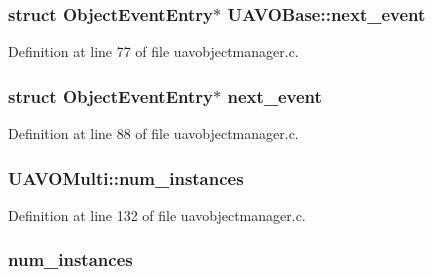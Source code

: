 \hypertarget{group___u_a_v_gaa0d6ea1fcd5ae56953e8dd7f244dd988}{
\subsubsection[{next\-\_\-event}]{\setlength{\rightskip}{0pt plus 5cm}struct {\bf Object\-Event\-Entry}$\ast$ U\-A\-V\-O\-Base\-::next\-\_\-event}}\label{group___u_a_v_gaa0d6ea1fcd5ae56953e8dd7f244dd988}


Definition at line 77 of file uavobjectmanager.\-c.

\hypertarget{group___u_a_v_ga198dfe31641d68ac23d11a5f98b07ac1}{
\subsubsection[{next\-\_\-event}]{\setlength{\rightskip}{0pt plus 5cm}struct {\bf Object\-Event\-Entry}$\ast$ next\-\_\-event}}\label{group___u_a_v_ga198dfe31641d68ac23d11a5f98b07ac1}


Definition at line 88 of file uavobjectmanager.\-c.

\hypertarget{group___u_a_v_ga9502c6a24b6d21d6ec4e48fbe166f1c4}{
\subsubsection[{num\-\_\-instances}]{ U\-A\-V\-O\-Multi\-::num\-\_\-instances}}\label{group___u_a_v_ga9502c6a24b6d21d6ec4e48fbe166f1c4}


Definition at line 132 of file uavobjectmanager.\-c.

\hypertarget{group___u_a_v_ga05eb394d494b0c5d3a579c1d9e5081d2}{
\subsubsection[{num\-\_\-instances}]{ num\-\_\-instances}}\label{group___u_a_v_ga05eb394d494b0c5d3a579c1d9e5081d2}


